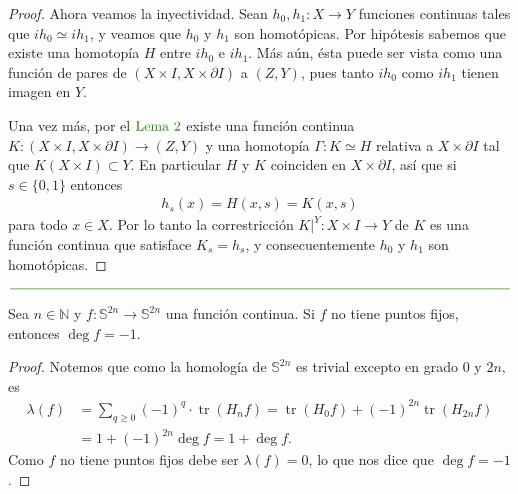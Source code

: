 \documentclass[11pt]{article}
\newcommand{\N}{\mathbb{N}}
\newcommand{\Ss}{\mathbb{S}}
\newcommand{\tr}{\operatorname{tr}}
\newcommand{\paint}[1]{\color{color}{#1}}
\newenvironment{lemma}[2][Lema]{\begin{trivlist}
\item[\hskip \labelsep \paint{{\bfseries #1}}\hskip \labelsep {\bfseries #2.}]}{\end{trivlist}}
\begin{document}
\begin{proof}
Ahora veamos la inyectividad. Sean $h_0,h_1 : X \to Y$ funciones continuas tales que $ih_0 \simeq ih_1$, y veamos que $h_0$ y $h_1$ son homotópicas. Por hipótesis sabemos que existe una homotopía $H$ entre $ih_0$ e $ih_1$. Más aún, ésta puede ser vista como una función de pares de $(X \times I, X \times \partial I)$ a $(Z,Y)$, pues tanto $ih_0$ como $ih_1$ tienen imagen en $Y$. 

Una vez más, por el $\paint{\text{Lema $2$}}$ existe una función continua $K : (X \times I, X \times \partial I) \to (Z,Y)$ y una homotopía $\Gamma : K \simeq H$ relativa a $X \times \partial I$ tal que $K(X \times I) \subset Y$. En particular $H$ y $K$ coinciden en $X \times \partial I$, así que si $s \in \{0,1\}$ entonces
\begin{align*}
h_s(x) = H(x,s) = K(x,s)
\end{align*}
para todo $x \in X$. Por lo tanto la correstricción $K|^Y : X \times I \to Y$ de $K$ es una función continua que satisface $K_s = h_s$, y consecuentemente $h_0$ y $h_1$ son homotópicas.
\end{proof}

\begin{center}
$\paint{
\rule{400pt}{0.5pt}
}$
\vspace{10pt}
\end{center}

\begin{lemma}{3} Sea $n \in \N$ y $f : \Ss^{2n} \to \Ss^{2n}$ una funci\'on continua. Si $f$ no tiene puntos fijos, entonces $\deg f = -1$.
\end{lemma}
\begin{proof} Notemos que como la homolog\'ia de $\Ss^{2n}$ es trivial excepto en grado $0$ y $2n$, es
\begin{align*}
\lambda(f) &= \sum_{q \geq 0}(-1)^q \cdot \tr(H_nf) = \tr(H_0f) + (-1)^{2n}\tr(H_{2n}f)\\
& = 1 + (-1)^{2n}\deg f = 1 + \deg f.
\end{align*}
Como $f$ no tiene puntos fijos debe ser $\lambda(f) = 0$, lo que nos dice que $\deg f = -1$. 
\end{proof}
\end{document}
